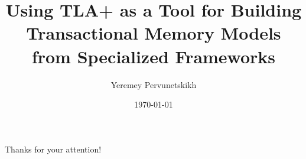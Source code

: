 \documentclass{beamer}
\title{Using TLA+ as a Tool for Building Transactional Memory Models from Specialized Frameworks}
\date{\today}
\author{Yeremey Pervunetskikh}
\institute{HSE University}
\begin{document}
\maketitle















\begin{frame}
    \centering
    \LARGE{Thanks for your attention!}
\end{frame}
\end{document}

